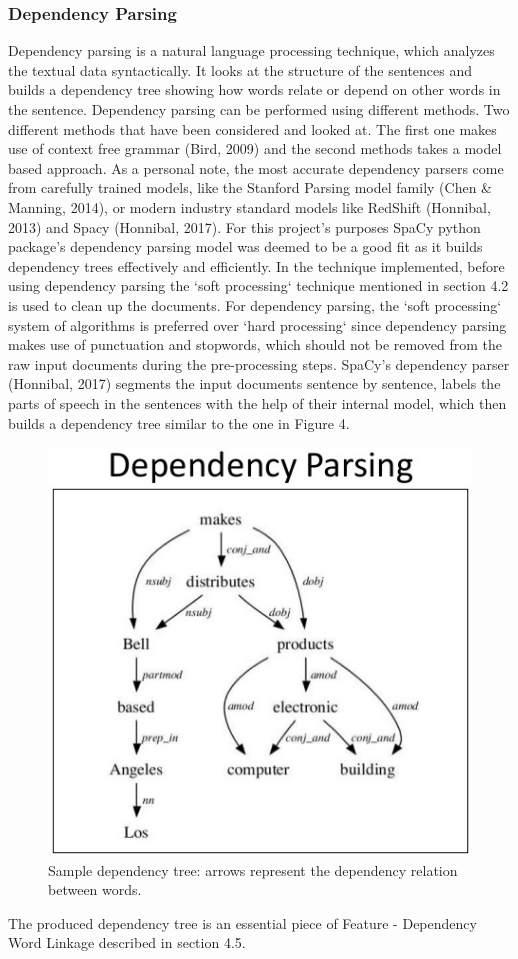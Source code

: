 \documentclass{sig-alternate}
\begin{document}
\subsubsection{Dependency Parsing}
Dependency parsing is a natural language processing technique, which analyzes the textual data syntactically. It looks at the structure of the sentences and builds a dependency tree showing how words relate or depend on other words in the sentence. Dependency parsing can be performed using different methods. Two different methods that have been considered and looked at. The first one makes use of context free grammar (Bird, 2009) and the second methods takes a model based approach. As a personal note, the most accurate dependency parsers come from carefully trained models, like the Stanford Parsing model family (Chen \& Manning, 2014), or modern industry standard models like RedShift (Honnibal, 2013) and Spacy (Honnibal, 2017). For this project's purposes SpaCy python package's dependency parsing model was deemed to be a good fit as it builds dependency trees effectively and efficiently. 
In the technique implemented, before using dependency parsing the `soft processing` technique mentioned in section 4.2 is used to clean up the documents. For dependency parsing, the `soft processing` system of algorithms is preferred over `hard processing` since dependency parsing makes use of punctuation and stopwords, which should not be removed from the raw input documents during the pre-processing steps. SpaCy's dependency parser (Honnibal, 2017) segments the input documents sentence by sentence, labels the parts of speech in the sentences with the help of their internal model, which then builds a dependency tree similar to the one in Figure 4.


\begin{figure}
\centering
\includegraphics[scale=0.60]{images/dependency-parsing.jpg}
\caption{Sample dependency tree: arrows represent the dependency relation between words.}
\end{figure}
The produced dependency tree is an essential piece of Feature - Dependency Word Linkage described in section 4.5.
\end{document}
